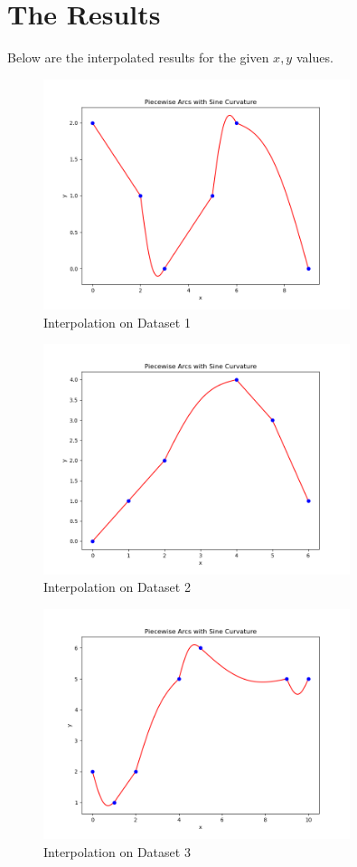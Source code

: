 \documentclass{article}
\begin{document}
\section{The Results}
Below are the interpolated results for the given \(x, y\) values.

\begin{figure}[htbp]
\centering
\includegraphics[width=0.8\textwidth]{test_case_1.png}
\caption{Interpolation on Dataset 1}
\end{figure}

\begin{figure}[htbp]
\centering
\includegraphics[width=0.8\textwidth]{test_case_2.png}
\caption{Interpolation on Dataset 2}
\end{figure}

\begin{figure}[htbp]
\centering
\includegraphics[width=0.8\textwidth]{test_case_3.png}
\caption{Interpolation on Dataset 3}
\end{figure}
\end{document}
